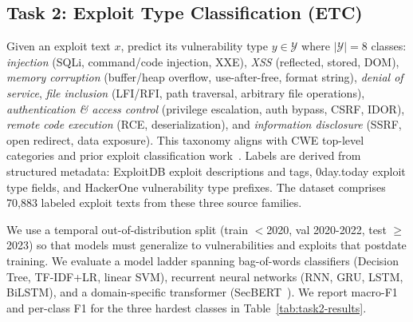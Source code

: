 \documentclass{article}
\begin{document}
\subsection{Task 2: Exploit Type Classification (ETC)}
\label{sec:task2}

Given an exploit text $x$, predict its vulnerability type $y \in \mathcal{Y}$ where $|\mathcal{Y}| = 8$ classes: \emph{injection} (SQLi, command/code injection, XXE), \emph{XSS} (reflected, stored, DOM), \emph{memory corruption} (buffer/heap overflow, use-after-free, format string), \emph{denial of service}, \emph{file inclusion} (LFI/RFI, path traversal, arbitrary file operations), \emph{authentication \& access control} (privilege escalation, auth bypass, CSRF, IDOR), \emph{remote code execution} (RCE, deserialization), and \emph{information disclosure} (SSRF, open redirect, data exposure). This taxonomy aligns with CWE top-level categories and prior exploit classification work~\citep{ampel2020dtl,ampel2024misq}. Labels are derived from structured metadata: ExploitDB exploit descriptions and tags, 0day.today exploit type fields, and HackerOne vulnerability type prefixes. The dataset comprises 70,883 labeled exploit texts from these three source families.

We use a temporal out-of-distribution split (train $<$2020, val 2020-2022, test $\geq$2023) so that models must generalize to vulnerabilities and exploits that postdate training. We evaluate a model ladder spanning bag-of-words classifiers (Decision Tree, TF-IDF+LR, linear SVM), recurrent neural networks (RNN, GRU, LSTM, BiLSTM), and a domain-specific transformer (SecBERT~\citep{secbert2022}). We report macro-F1 and per-class F1 for the three hardest classes in Table~\ref{tab:task2-results}.
\end{document}
